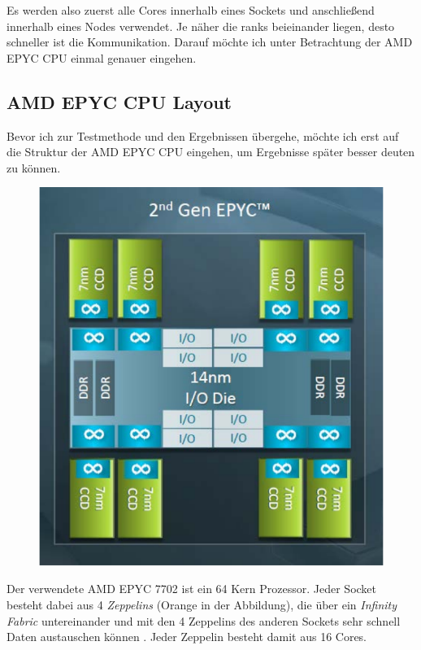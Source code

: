 \documentclass[german,plainarticle,hyperref,utf8]{zihpub}
\begin{document}
	Es werden also zuerst alle Cores innerhalb eines Sockets und anschließend innerhalb eines Nodes verwendet. Je näher die ranks beieinander liegen, desto schneller ist die Kommunikation. Darauf möchte ich unter Betrachtung der AMD EPYC CPU einmal genauer eingehen.
	
	\subsection{AMD EPYC CPU Layout} \label{cpu_layout}
	Bevor ich zur Testmethode und den Ergebnissen übergehe, möchte ich erst auf die Struktur der AMD EPYC CPU eingehen, um Ergebnisse später besser deuten zu können.\\
	
	\begin{figure}[h]
		\centering
		\includegraphics[scale=0.35]{AMD_EPYC.png}
	\end{figure}
	
	Der verwendete AMD EPYC 7702 ist ein 64 Kern Prozessor. Jeder Socket besteht dabei aus 4 \textit{Zeppelins} (Orange in der Abbildung), die über ein \textit{Infinity Fabric} untereinander und mit den 4 Zeppelins des anderen Sockets sehr schnell Daten austauschen können \cite{amd}. Jeder Zeppelin besteht damit aus 16 Cores.\\
	
\end{document}
